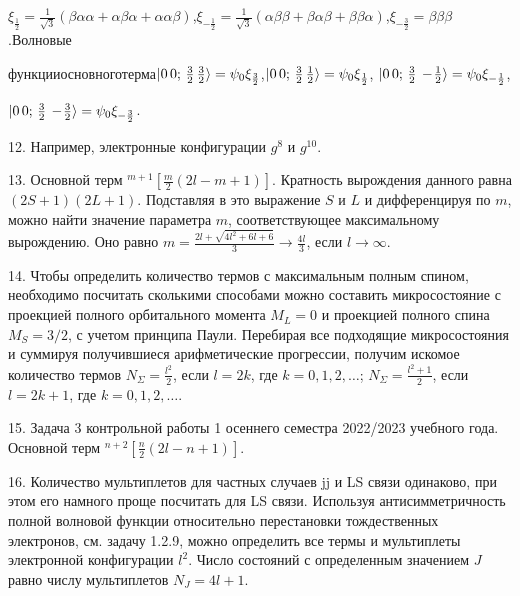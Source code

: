 \vspace{-\parskip+0.8mm}
$\xi_{\frac12}=\frac{1}{\sqrt3} (\beta \alpha \alpha + \alpha \beta \alpha + \alpha \alpha \beta )$,\hspace{\fill}$\xi_{-\frac12}=\frac{1}{\sqrt3} (\alpha \beta \beta + \beta \alpha \beta + \beta \beta \alpha )$,\hspace{\fill}$\xi_{-\frac32}=\beta \beta \beta$.\hspace{\fill}Волновые \par
\vspace{-\parskip+1.2mm}
функции\hspace{\fill}основного\hspace{\fill}терма\hspace{\fill}$\ket{0\,0;\,\frac32\,\frac32}=\psi_0 \xi_{\frac32}$,\hspace{\fill}$\ket{0\,0;\,\frac32\,\frac12}=\psi_0 \xi_{\frac12}$, $\ket{0\,0;\,\frac32\,-\!\frac12}=\psi_0 \xi_{-\frac12}$, \par
\vspace{-\parskip+1mm}
$\ket{0\,0;\,\frac32\,-\!\frac32}=\psi_0 \xi_{-\frac32}$.\par
12. Например, электронные конфигурации $g^8$ и $g^{10}$.\par
13. Основной терм $^{m+1}\left[\frac m2 (2l-m+1)\right]$. Кратность вырождения данного равна $(2S+1)(2L+1)$. Подставляя в это выражение $S$ и $L$ и  дифференцируя по $m$, можно найти значение параметра $m$, соответствующее максимальному вырождению. Оно равно $m=\frac{2l+\sqrt{4l^2 +6l+6}}{3} \rightarrow \frac{4l}{3}$, если $l \rightarrow \infty$.\par
14. Чтобы определить количество термов с максимальным полным спином, необходимо посчитать сколькими способами можно составить микросостояние с проекцией полного орбитального момента $M_L=0$ и проекцией полного спина $M_S=3/2$, с учетом принципа Паули. Перебирая все подходящие микросостояния и суммируя получившиеся арифметические прогрессии, получим искомое количество термов $N_{\Sigma}=\frac{l^2}{2}$, если $l=2k$, где $k=0,1,2,\ldots$; $N_{\Sigma}=\frac{l^2+1}{2}$, если $l=2k+1$, где $k=0,1,2,\ldots$.\par
15. Задача 3 контрольной работы 1 осеннего семестра 2022/2023 учебного года. Основной терм $^{n+2 }\left[\frac n2 (2l-n+1)\right]$.\par
16. Количество мультиплетов для частных случаев jj и LS связи одинаково, при этом его намного проще посчитать для LS связи. Используя антисимметричность полной волновой функции относительно перестановки тождественных электронов, см. задачу 1.2.9, можно определить все термы и мультиплеты электронной конфигурации $l^2$. Число состояний с определенным значением $J$ равно числу мультиплетов $N_J=4l+1$.\par
